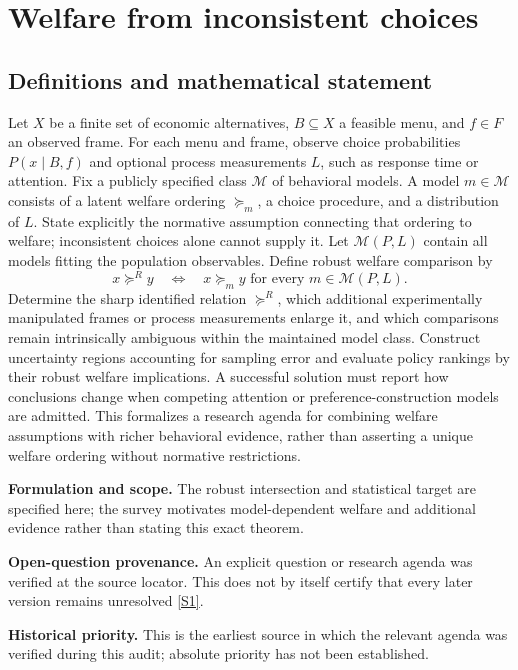 \documentclass[11pt]{article}
\newcommand{\sref}[2]{\hyperlink{source:#1:#2}{[S#2]}}
\begin{document}
\section*{Welfare from inconsistent choices}\label{30007554}
\subsection{Definitions and mathematical statement}
Let \(X\) be a finite set of economic alternatives, \(B\subseteq X\) a feasible menu, and \(f\in F\) an observed frame. For each menu and frame, observe choice probabilities \(P(x\mid B,f)\) and optional process measurements \(L\), such as response time or attention. Fix a publicly specified class \(\mathcal M\) of behavioral models. A model \(m\in\mathcal M\) consists of a latent welfare ordering \(\succeq_m\), a choice procedure, and a distribution of \(L\). State explicitly the normative assumption connecting that ordering to welfare; inconsistent choices alone cannot supply it. Let \(\mathcal M(P,L)\) contain all models fitting the population observables. Define robust welfare comparison by
\[
 x\succeq^R y\quad\Longleftrightarrow\quad x\succeq_m y\text{ for every }m\in\mathcal M(P,L).
\]
Determine the sharp identified relation \(\succeq^R\), which additional experimentally manipulated frames or process measurements enlarge it, and which comparisons remain intrinsically ambiguous within the maintained model class. Construct uncertainty regions accounting for sampling error and evaluate policy rankings by their robust welfare implications. A successful solution must report how conclusions change when competing attention or preference-construction models are admitted. This formalizes a research agenda for combining welfare assumptions with richer behavioral evidence, rather than asserting a unique welfare ordering without normative restrictions.

\par\textbf{Formulation and scope.} The robust intersection and statistical target are specified here; the survey motivates model-dependent welfare and additional evidence rather than stating this exact theorem.

\par\textbf{Open-question provenance.} An explicit question or research agenda was verified at the source locator. This does not by itself certify that every later version remains unresolved \sref{30007554}{1}.

\par\textbf{Historical priority.} This is the earliest source in which the relevant agenda was verified during this audit; absolute priority has not been established.
\end{document}
